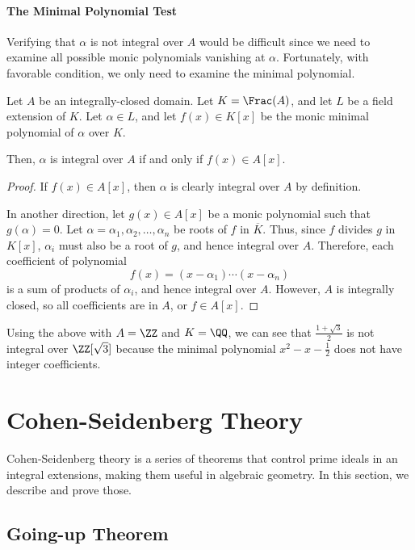 \paragraph{The Minimal Polynomial Test}
Verifying that $\alpha$ is not integral over $A$
would be difficult since we need to examine all
possible monic polynomials vanishing at $\alpha$.
Fortunately, with favorable condition,
we only need to examine the minimal polynomial.
\begin{lemma}
    \label{lem:min_poly_test}
    Let $A$ be an integrally-closed domain.
    Let $K=\Frac(A)$, and let $L$ be a field extension of $K$.
    Let $\alpha\in L$, and let $f(x)\in K[x]$ be the monic minimal polynomial of $\alpha$ over $K$.

    Then, $\alpha$ is integral over $A$ if and only if
    $f(x)\in A[x]$.
\end{lemma}
\begin{proof}
    If $f(x)\in A[x]$, then $\alpha$ is clearly integral over $A$ by definition.

    In another direction, let $g(x)\in A[x]$ be a monic polynomial such that $g(\alpha)=0$.
    Let $\alpha=\alpha_1, \alpha_2,\dots,\alpha_n$
    be roots of $f$ in $\overline K$.
    Thus, since $f$ divides $g$ in $K[x]$,
    $\alpha_i$ must also be a root of $g$, 
    and hence integral over $A$.
    Therefore, each coefficient of polynomial
    $$f(x) = (x-\alpha_1)\cdots (x-\alpha_n)$$
    is a sum of products of $\alpha_i$, and hence integral
    over $A$. However, $A$ is integrally closed, so
    all coefficients are in $A$, or $f\in A[x]$.
\end{proof}
\begin{example}
Using the above 
with $A=\ZZ$ and $K=\QQ$, we can see that
$\tfrac{1+\sqrt{3}}2$ is not integral over $\ZZ[\sqrt 3]$
because the minimal polynomial $x^2-x-\tfrac 12$
does not have integer coefficients.
\end{example}

\section{Cohen-Seidenberg Theory}
Cohen-Seidenberg theory is a series of theorems
that control prime ideals in an integral extensions,
making them useful in algebraic geometry.
In this section, we describe and prove those.
\subsection{Going-up Theorem}
